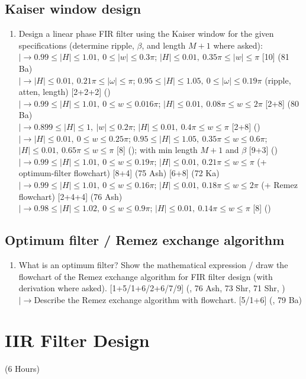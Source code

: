 \documentclass[12pt]{article}
\newcommand{\lb}{\\$\left|\rightarrow\right.$}
\begin{document}
  \subsection{Kaiser window design}
    \begin{enumerate}[topsep=0pt, noitemsep]
      \item Design a linear phase FIR filter using the Kaiser window for the given specifications (determine ripple, $\beta$, and length $M+1$ where asked):
        \lb $0.99\le|H|\le1.01,\ 0\le|w|\le0.3\pi$; $|H|\le0.01,\ 0.35\pi\le|w|\le\pi$ \hfill [10] (81 Ba)
        \lb $|H|\le0.01,\ 0.21\pi\le|\omega|\le\pi$; $0.95\le|H|\le1.05,\ 0\le|\omega|\le0.19\pi$ (ripple, atten, length) \hfill [2+2+2] ()
        \lb $0.99\le|H|\le1.01,\ 0\le w\le0.016\pi$; $|H|\le0.01,\ 0.08\pi\le w\le2\pi$ \hfill [2+8] (80 Ba)
        \lb $0.899\le|H|\le1,\ |w|\le0.2\pi$; $|H|\le0.01,\ 0.4\pi\le w\le\pi$ \hfill [2+8] ()
        \lb $|H|\le0.01,\ 0\le w\le0.25\pi$; $0.95\le|H|\le1.05,\ 0.35\pi\le w\le0.6\pi$; $|H|\le0.01,\ 0.65\pi\le w\le\pi$ \hfill [8] (); with min length $M+1$ and $\beta$ \hfill [9+3] ()
        \lb $0.99\le|H|\le1.01,\ 0\le w\le0.19\pi$; $|H|\le0.01,\ 0.21\pi\le w\le\pi$ (+ optimum-filter flowchart) \hfill [8+4] (75 Ash) [6+8] (72 Ka)
        \lb $0.99\le|H|\le1.01,\ 0\le w\le0.16\pi$; $|H|\le0.01,\ 0.18\pi\le w\le2\pi$ (+ Remez flowchart) \hfill [2+4+4] (76 Ash)
        \lb $0.98\le|H|\le1.02,\ 0\le w\le0.9\pi$; $|H|\le0.01,\ 0.14\pi\le w\le\pi$ \hfill [8] ()
    \end{enumerate}

  \subsection{Optimum filter / Remez exchange algorithm}
    \begin{enumerate}[topsep=0pt, noitemsep]
      \item What is an optimum filter? Show the mathematical expression / draw the flowchart of the Remez exchange algorithm for FIR filter design (with derivation where asked). \hfill [1+5/1+6/2+6/7/9] (, 76 Ash, 73 Shr, 71 Shr, )
        \lb Describe the Remez exchange algorithm with flowchart. \hfill [5/1+6] (, 79 Ba)
    \end{enumerate}

\pagebreak
\section{IIR Filter Design}
\begin{center}(6 Hours)\end{center}
\end{document}
